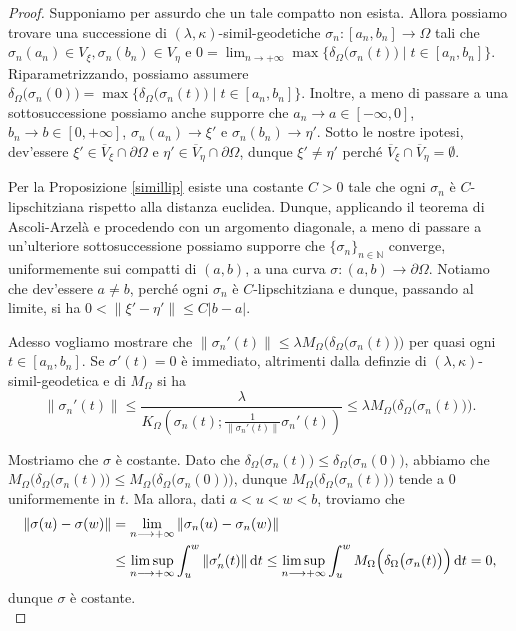\begin{proof}
    Supponiamo per assurdo che un tale compatto non esista. Allora possiamo trovare una successione di $(\lambda,\kappa)$-simil-geodetiche $\sigma_n:[a_n,b_n]\longrightarrow\Omega$ tali che $\sigma_n(a_n)\in V_\xi,\sigma_n(b_n)\in V_\eta$ e $\displaystyle0=\lim_{n\rightarrow+\infty}\max\{\delta_\Omega\big(\sigma_n(t)\big) \mid t\in[a_n,b_n]\}$. Riparametrizzando, possiamo assumere $\delta_\Omega\big(\sigma_n(0)\big)=\max\{\delta_\Omega\big(\sigma_n(t)\big) \mid t\in[a_n,b_n]\}$. Inoltre, a meno di passare a una sottosuccessione possiamo anche supporre che $a_n \longrightarrow a\in[-\infty,0]$, $b_n \longrightarrow b\in[0,+\infty]$, $\sigma_n(a_n)\longrightarrow \xi'$ e $\sigma_n(b_n)\longrightarrow\eta'$. Sotto le nostre ipotesi, dev'essere $\xi'\in\overline{V}_\xi\cap\partial\Omega$ e $\eta'\in\overline{V}_\eta\cap\partial\Omega$, dunque $\xi'\not=\eta'$ perché $\overline{V}_\xi\cap\overline{V}_\eta=\emptyset$.

    Per la Proposizione \ref{simillip} esiste una costante $C>0$ tale che ogni $\sigma_n$ è $C$-lipschitziana rispetto alla distanza euclidea. Dunque, applicando il teorema di Ascoli-Arzelà e procedendo con un argomento diagonale, a meno di passare a un'ulteriore sottosuccessione possiamo supporre che $\{\sigma_n\}_{n\in\mathbb{N}}$ converge, uniformemente sui compatti di $(a,b)$, a una curva $\sigma:(a,b)\longrightarrow\partial\Omega$. Notiamo che dev'essere $a\not=b$, perché ogni $\sigma_n$ è $C$-lipschitziana e dunque, passando al limite, si ha $0<\|\xi'-\eta'\|\le C|b-a|$.
    
    Adesso vogliamo mostrare che $\|\sigma_n'(t)\| \le \lambda M_\Omega\Big(\delta_\Omega\big(\sigma_n(t)\big)\Big)$ per quasi ogni $t\in[a_n,b_n]$. Se $\sigma'(t)=0$ è immediato, altrimenti dalla definzie di $(\lambda,\kappa)$-simil-geodetica e di $M_\Omega$ si ha
    $$\|\sigma_n'(t)\| \le \frac{\lambda}{K_\Omega\left(\sigma_n(t);\frac{1}{\|\sigma_n'(t)\|}\sigma_n'(t)\right)} \le \lambda M_\Omega\Big(\delta_\Omega\big(\sigma_n(t)\big)\Big).$$

    Mostriamo che $\sigma$ è costante. Dato che $\delta_\Omega\big(\sigma_n(t)\big) \le \delta_\Omega\big(\sigma_n(0)\big)$, abbiamo che $M_\Omega\Big(\delta_\Omega\big(\sigma_n(t)\big)\Big) \le M_\Omega\Big(\delta_\Omega\big(\sigma_n(0)\big)\Big)$, dunque $M_\Omega\Big(\delta_\Omega\big(\sigma_n(t)\big)\Big)$ tende a $0$ uniformemente in $t$. Ma allora, dati $a<u<w<b$, troviamo che
    \begin{align*}
        \|\sigma(u)-\sigma(w)\|&=\lim_{n\longrightarrow+\infty}\|\sigma_n(u)-\sigma_n(w)\| \\
        &\le \limsup_{n\longrightarrow+\infty}\int_u^w \|\sigma_n'(t)\|\mathop{}\!\mathrm{d} t \le \limsup_{n\longrightarrow+\infty}\int_u^w M_\Omega\Big(\delta_\Omega\big(\sigma_n(t)\big)\Big) \mathop{}\!\mathrm{d} t=0,
    \end{align*}
    dunque $\sigma$ è costante. \\


\end{proof}

